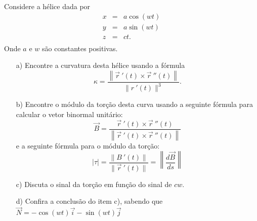 \begin{exeresol}
Considere a hélice dada por
\begin{eqnarray*}
x&=&a\cos(wt)\\
y&=&a\sin(wt)\\
z&=&ct.\\
\end{eqnarray*}
Onde $a$ e $w$ são constantes positivas.
\begin{itemize}
\item[a)] Encontre  a curvatura desta hélice usando a fórmula
$$\kappa=\frac{\left\|\vec{r}\ \!'(t)\times \vec{r}\ \!''(t)\right\|}{\|r\ \!'(t)\|^3}.$$
\item[b)] Encontre o módulo da torção desta curva usando a seguinte fórmula para calcular o vetor binormal unitário: $$\vec{B}=\frac{\vec{r}\ \!'(t)\times \vec{r}\ \!''(t)}{\left\|\vec{r}\ \!'(t)\times \vec{r}\ \!''(t)\right\|}$$
e a seguinte fórmula para o módulo da torção:
$$|\tau|=\frac{\|B\ \!'(t)\|}{\|\vec{r}\ \!'(t)\|}=\left\|\frac{d\vec{B}}{ds}\right\|$$

\item[c)] Discuta o sinal da torção em função do sinal de $cw$.
\item[d)] Confira a conclusão do item c), sabendo que $\vec{N}=-\cos(wt)\vec{i}-\sin(wt)\vec{j}$
\end{itemize}
\end{exeresol}
